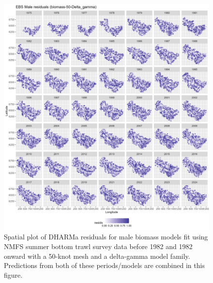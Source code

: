 \documentclass[
]{article}
\begin{document}
\begin{figure}

{\centering \includegraphics[width=1\linewidth,height=1\textheight]{../BAIRDI/Figures/DHARMa_Male_biomass-50-Delta_gamma_SPATIAL} 

}

\caption{Spatial plot of DHARMa residuals for male biomass models fit using NMFS summer bottom trawl survey data before 1982 and 1982 onward with a 50-knot mesh and a delta-gamma model family. Predictions from both of these periods/models are combined in this figure.}\label{fig:DHARMa-bio-spat-50-male}
\end{figure}
\end{document}
